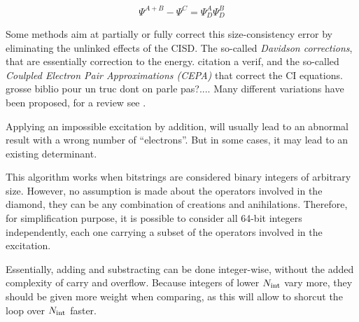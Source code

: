 \documentclass[./thesis.tex]{subfiles}
\begin{document}
\begin{equation}
\Psi^{A+B} - \Psi^C  = \Psi_{D}^A \Psi_{D}^B
\end{equation}

Some methods aim at partially or fully correct this size-consistency error by eliminating the unlinked effects of the CISD. The so-called \emph{Davidson corrections}, that are essentially correction to the energy\cite{Langhoff_1974}. \alert{citation a verif}, and the so-called \emph{Coulpled Electron Pair Approximations (CEPA)} that correct the CI equations\cite{Kelly_1963,Kelly_1964,Meyer_1971,Meyer_1973,Meyer_1974,Ahlrichs_1975}. \alert{grosse biblio pour un truc dont on parle pas?...}. Many different variations have been proposed, for a review see \cite{Koch_1981}.






\begin{algorithm}

\ForAll{$\kI$ with $EXC(\kI, \kalpha) \leq 4$}{

$\delta \gets -(I + \alpha)$ \;
$i \gets 1$ \;
$j \gets 1$ \;
\While{$j \leq N \wedge i \leq N$}{
	\uIf{$D_j - D_i > \delta$}{
		increment $i$ \;
	}
	\uElseIf{$D_j - D_i < \delta$}{
		increment $j$ \;
	}
	\Else
	{
		\tcc{$\hat T_{I \rightarrow D_j}$ is $D_j-I$}
		\tcc{$D_i + (D_j-I) = \alpha$}
		
		
		
		
		\tcc{\alert{check if addition applies correct excitaion}}
		\tcc{impossible exciation results in an abnormal number of modified spinorbitals}	
		\If{$||D_j \oplus I|| = ||D_i \oplus \alpha||$}{
			diamond found \;
		}
		increment $i$ and $j$ \;
	}
}
}
\end{algorithm}

Applying an impossible excitation by addition, will usually lead to an abnormal result with a wrong number of ``electrons''. But in some cases, it may lead to an existing determinant. 



This algorithm works when bitstrings are considered binary integers of arbitrary size. However, no assumption is made about the operators involved in the diamond, they can be any combination of creations and anihilations. Therefore, for simplification purpose, it is possible to consider all 64-bit integers independently, each one carrying a subset of the operators involved in the excitation.

Essentially, adding and substracting can be done integer-wise, without the added complexity of carry and overflow.
Because integers of lower ${N_\text{int}}$ vary more, they should be given more weight when comparing, as this will allow to shorcut the loop over ${N_\text{int}}$ faster.
\end{document}
